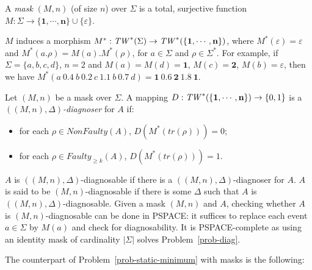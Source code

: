 \documentclass[letterpaper,10pt,conference]{ieeeconf}  \IEEEoverridecommandlockouts                              \overrideIEEEmargins
\def\trace{\textit{tr}}
\def\faulty{\textit{Faulty}}
\def\nonfaulty{\textit{NonFaulty}}
\def\endef{\ifmmode\squareforged\else{\unskip\nobreak\hfil
\penalty50\hskip1em\null\nobreak\hfil$\blacksquare$
\parfillskip=0pt\finalhyphendemerits=0\endgraf}\fi}
\def\motvide{\varepsilon}
\def\tw{\textit{TW\/}}
\begin{document}
\begin{definition}[Mask]\label{def-mask}
  A \emph{mask} $(M,n)$ (of size $n$) over $\Sigma$ is a total,
  surjective function $M: \Sigma \rightarrow
  \{\mathbf{1},\cdots,\mathbf{n}\} \cup \{\varepsilon\}$. \endef
\end{definition}
$M$ induces a morphism $M^* : \tw^*(\Sigma) \rightarrow
\tw^*(\{\mathbf{1},\cdots,\mathbf{n}\})$, where
$M^*(\varepsilon)=\varepsilon$ and $M^*(a.\rho)=M(a).M^*(\rho)$, for
$a\in\Sigma$ and $\rho\in\Sigma^*$.  For example, if
$\Sigma=\{a,b,c,d\}$, $n=2$ and $M(a)=M(d)=\mathbf{1}$,
$M(c)=\mathbf{2}$, $M(b)=\motvide$, then we have $M^*(a\ 0.4 \ b \ 0.2
\ c \ 1.1 \ b \ 0.7 \ d) = \mathbf{1} \ 0.6 \ \mathbf{2} \ 1.8\
\mathbf{1}$.


\begin{definition}\label{def-mask-diag} Let
  $(M,n)$ be a mask over $\Sigma$. A mapping $D:
  \tw^*(\{\mathbf{1},\cdots,\mathbf{n}\}) \rightarrow \{0,1\}$ is a
  \emph{$((M,n),\Delta)$-diagnoser} for $A$ if:
  \begin{itemize}
  \item for each $\rho \in \nonfaulty(A)$,
    $D(M^*(\trace(\rho)))=0$;
  \item for each $\rho \in \faulty_{\geq k}(A)$,
    $D(M^*(\trace(\rho)))=1$. \endef
  \end{itemize}
\end{definition}

$A$ is $((M,n),\Delta)$-diagnosable if there is a
$((M,n),\Delta)$-diagnoser for $A$. $A$ is said to be
$(M,n)$-diagnosable if there is some $\Delta$ such that $A$ is
$((M,n),\Delta)$-diagnosable.  Given a mask $(M,n)$ and $A$, checking
whether $A$ is $(M,n)$-diagnosable can be done in PSPACE: it suffices
to replace each event $a \in \Sigma$ by $M(a)$ and check for
diagnosability. It is PSPACE-complete as using an identity mask of
cardinality $|\Sigma|$ solves Problem~\ref{prob-diag}.

The counterpart of Problem~\ref{prob-static-minimum} with masks is the
following:
\end{document}
